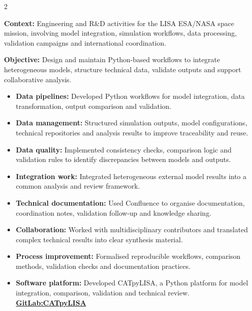 \documentclass[8pt,a4paper,ragged2e,withhyper]{altacv}
\begin{document}
\begin{paracol}{2}
\divider


\textbf{Context:} Engineering and R\&D activities for the LISA ESA/NASA space mission, involving model integration, simulation workflows, data processing, validation campaigns and international coordination.

\textbf{Objective:} Design and maintain Python-based workflows to integrate heterogeneous models, structure technical data, validate outputs and support collaborative analysis.

\begin{itemize}
  \item \textbf{Data pipelines:} Developed Python workflows for model integration, data transformation, output comparison and validation.
  \item \textbf{Data management:} Structured simulation outputs, model configurations, technical repositories and analysis results to improve traceability and reuse.
  \item \textbf{Data quality:} Implemented consistency checks, comparison logic and validation rules to identify discrepancies between models and outputs.
  \item \textbf{Integration work:} Integrated heterogeneous external model results into a common analysis and review framework.
  \item \textbf{Technical documentation:} Used Confluence to organise documentation, coordination notes, validation follow-up and knowledge sharing.
  \item \textbf{Collaboration:} Worked with multidisciplinary contributors and translated complex technical results into clear synthesis material.
  \item \textbf{Process improvement:} Formalised reproducible workflows, comparison methods, validation checks and documentation practices.
  \item \textbf{Software platform:} Developed CATpyLISA, a Python platform for model integration, comparison, validation and technical review.
  \textcolor{DarkPastelRed}{\href{https://gitlab.oca.eu/gboileau/lisa_l3_tools}{\bf GitLab:CATpyLISA}}
\end{itemize}

\divider



\end{paracol}
\end{document}

